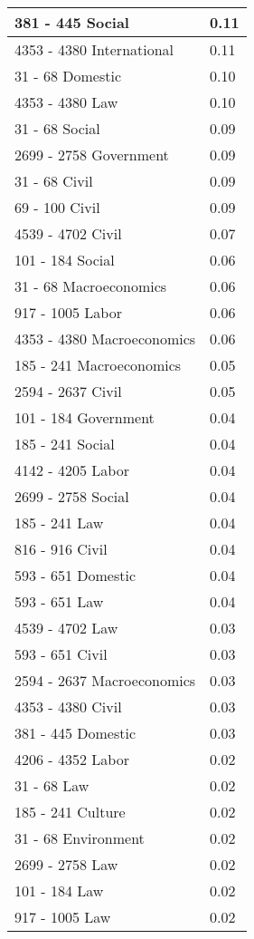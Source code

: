 \documentclass{article}
\begin{document}
\begin{longtable}{ll}
381 - 445 Social & 0.11 \\ \hline
4353 - 4380 International & 0.11 \\ \hline
31 - 68 Domestic & 0.10 \\ \hline
4353 - 4380 Law & 0.10 \\ \hline
31 - 68 Social & 0.09 \\ \hline
2699 - 2758 Government & 0.09 \\ \hline
31 - 68 Civil & 0.09 \\ \hline
69 - 100 Civil & 0.09 \\ \hline
4539 - 4702 Civil & 0.07 \\ \hline
101 - 184 Social & 0.06 \\ \hline
31 - 68 Macroeconomics & 0.06 \\ \hline
917 - 1005 Labor & 0.06 \\ \hline
4353 - 4380 Macroeconomics & 0.06 \\ \hline
185 - 241 Macroeconomics & 0.05 \\ \hline
2594 - 2637 Civil & 0.05 \\ \hline
101 - 184 Government & 0.04 \\ \hline
185 - 241 Social & 0.04 \\ \hline
4142 - 4205 Labor & 0.04 \\ \hline
2699 - 2758 Social & 0.04 \\ \hline
185 - 241 Law & 0.04 \\ \hline
816 - 916 Civil & 0.04 \\ \hline
593 - 651 Domestic & 0.04 \\ \hline
593 - 651 Law & 0.04 \\ \hline
4539 - 4702 Law & 0.03 \\ \hline
593 - 651 Civil & 0.03 \\ \hline
2594 - 2637 Macroeconomics & 0.03 \\ \hline
4353 - 4380 Civil & 0.03 \\ \hline
381 - 445 Domestic & 0.03 \\ \hline
4206 - 4352 Labor & 0.02 \\ \hline
31 - 68 Law & 0.02 \\ \hline
185 - 241 Culture & 0.02 \\ \hline
31 - 68 Environment & 0.02 \\ \hline
2699 - 2758 Law & 0.02 \\ \hline
101 - 184 Law & 0.02 \\ \hline
917 - 1005 Law & 0.02 \\ \hline

\end{longtable}
\end{document}
